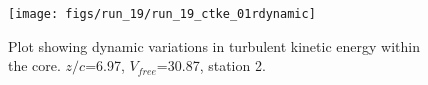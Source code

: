 \begin{figure}[H]
\centering
\texttt{[image: figs/run\_19/run\_19\_ctke\_01rdynamic]}
\caption{Plot showing dynamic variations in turbulent kinetic energy within the core. $z/c$=6.97, $V_{free}$=30.87, station 2.}
\label{fig:run_19_ctke_01rdynamic}
\end{figure}


